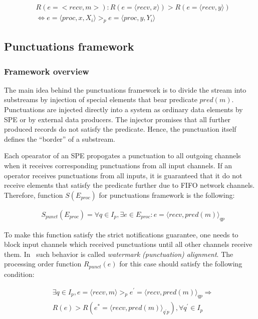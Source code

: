 \begin{align*}
& R(e=<recv,m>): R(e=\langle recv, x\rangle) > R(e=\langle recv, y\rangle) \\
& \Longleftrightarrow e=\langle proc,x,X_i\rangle >_p e=\langle proc,y,Y_i\rangle
\end{align*}

\subsection{Punctuations framework}

\subsubsection{Framework overview}

The main idea behind the punctuations framework is to divide the stream into substreams by injection of special elements that bear predicate $pred(m)$. Punctuations are injected directly into a system as ordinary data elements by SPE or by external data producers. The injector promises that all further produced records do not satisfy the predicate. Hence, the punctuation itself defines the ``border'' of a substream.

Each opearator of an SPE propogates a punctuation to all outgoing channels when it receives corresponding punctuations from all input channels. If an operator receives punctuations from all inputs, it is guaranteed that it do not receive elements that satisfy the predicate further due to FIFO network channels. Therefore, function $S(E_{proc})$ for punctuations framework is the following:

\begin{align*}
& S_{punct}(E_{proc}) = \forall q \in I_p, \exists e \in E_{proc} : e = \langle recv,pred(m)\rangle_{qp}
\end{align*}

To make this function satisfy the strict notifications guarantee, one needs to block input channels which received punctuations until all other channels receive them. In~\cite{Carbone:2017:SMA:3137765.3137777} such behavior is called {\em watermark (punctuation) alignment}. The processing order function $R_{punct}(e)$ for this case should satisfy the following condition:

\begin{align*}
& \exists q \in I_p, e = \langle recv,m \rangle >_p e^{'} = \langle recv,pred(m)\rangle_{qp} \Longrightarrow \\ 
& R(e) > R(e^{*}= \langle recv,pred(m) \rangle_{q^{'}p}), \forall q^{'} \in I_p
\end{align*}

